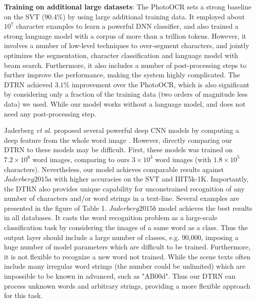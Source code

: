 \documentclass[letterpaper]{article}
\begin{document}
\textbf{Training on additional large datasets}: The PhotoOCR \cite{Bissacco2013} sets a strong baseline on the SVT ($90.4\%$) by using large additional training data.
 It employed about $10^7$ character examples to learn a powerful DNN classifier, and also trained a strong language model with a corpus of more than a trillion tokens. However, it involves a number of low-level techniques to over-segment characters, and jointly optimizes the segmentation, character classification and language model with beam search.  Furthermore, it also includes a number of post-processing steps to further improve the performance, making the system highly complicated.
 The DTRN achieved $3.1\%$ improvement over the PhotoOCR, which is also significant by considering only a fraction of the training data (two orders of magnitude less data) we used. While our model works without a language model, and does not need any post-processing step.

Jaderberg \emph{et al.}  proposed several powerful deep CNN models by computing a deep feature from the whole word image \cite{Jaderberg2014b,Jaderberg2015a,Jaderberg2015b}. However, directly comparing our DTRN to these models may be difficult. First, these models was trained on $7.2\times10^6$ word images, comparing to ours $3\times10^3$ word images (with $1.8\times10^5$ characters). Nevertheless,
our model achieves comparable results against $Jaderberg2015a$ with higher accuracies on the SVT and IIIT5k-1K. Importantly, the DTRN also provides unique capability for unconstrained recognition of any number of characters and/or word strings in a text-line. Several examples are presented in the figure of Table 1. $Jaderberg2015b$ model achieves the best results in all databases.  It casts the word recognition problem as a large-scale classification task by considering the images of a same word as a class.
Thus the output layer should include a large number of classes, e.g. 90,000, imposing a huge number of model parameters which are difficult to be trained.
Furthermore, it is not flexible to recognize a new word not trained.
While the scene texts often include many irregular word strings (the number could be unlimited) which are impossible to be known in advanced, such as "AB00d".
Thus our DTRN can process unknown words and arbitrary strings, providing a more flexible approach for this task.
\end{document}
